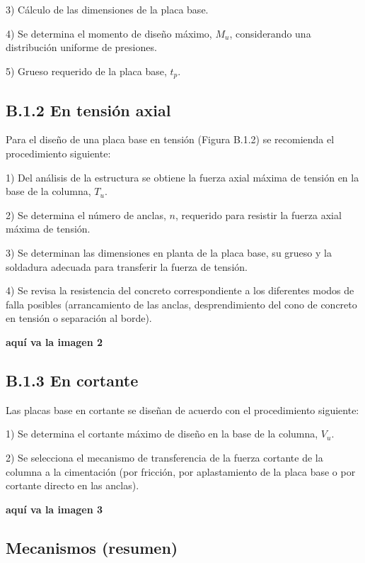 3) Cálculo de las dimensiones de la placa base.

4) Se determina el momento de diseño máximo, $M_u$, considerando una distribución uniforme de presiones.

5) Grueso requerido de la placa base, $t_p$.

\subsection*{B.1.2 En tensión axial}

Para el diseño de una placa base en tensión (Figura B.1.2) se recomienda el procedimiento siguiente:

1) Del análisis de la estructura se obtiene la fuerza axial máxima de tensión en la base de la columna, $T_u$.

2) Se determina el número de anclas, $n$, requerido para resistir la fuerza axial máxima de tensión.

3) Se determinan las dimensiones en planta de la placa base, su grueso y la soldadura adecuada para transferir la fuerza de tensión.

4) Se revisa la resistencia del concreto correspondiente a los diferentes modos de falla posibles (arrancamiento de las anclas, desprendimiento del cono de concreto en tensión o separación al borde).

\begin{center}
\textbf{aquí va la imagen 2}
\end{center}

\subsection*{B.1.3 En cortante}

Las placas base en cortante se diseñan de acuerdo con el procedimiento siguiente:

1) Se determina el cortante máximo de diseño en la base de la columna, $V_u$.

2) Se selecciona el mecanismo de transferencia de la fuerza cortante de la columna a la cimentación (por fricción, por aplastamiento de la placa base o por cortante directo en las anclas).

\begin{center}
\textbf{aquí va la imagen 3}
\end{center}

\subsection*{Mecanismos (resumen)}

